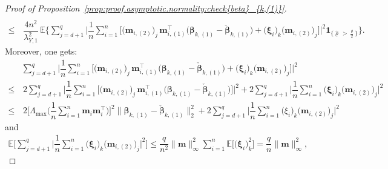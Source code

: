 \documentclass[
  12pt]{article}
\def\E{\mathbb{E}}
\def\M{\mathbf{m}}
\begin{document}
\begin{proof}[Proof of Proposition~\ref{prop:proof.asymptotic.normality:check{beta}_{k,(1)}}]
\begin{align*}
		\\
		\leq  &  \,    
		\dfrac{4 n^{2}}{\lambda_{Y,1}^{2}} \,  \E \Bigg\{  \sum_{j=d+1}^{q}  \Big| \dfrac{1}{n} \sum_{i=1}^{n} \Big[  \big( \M_{i,(2)}   \big)_{j}  \,   \M_{i,(1)}^{\top}  \big( \bm{\beta}_{k,(1)}  - \check{\bm{\beta}}_{k,(1)} \big)    +     \big( \bm{\xi}_{i}   \big)_{k}     \big( \M_{i,(2)}  \big)_{j}      \Big]   \Big|^{2}
		\mathbf{1}_{ \big\{ \widehat{ \varrho } \, > \frac{\varrho}{2} \big\} }  \Bigg\}.  
	\end{align*}
	Moreover, one gets:    
	\begin{align*}
		& \sum_{j=d+1}^{q}  \Big|  \dfrac{1}{n}  \sum_{i=1}^{n} \Big[  \big( \M_{i,(2)}   \big)_{j}  \,   \M_{i,(1)}^{\top}  \big( \bm{\beta}_{k,(1)}  - \check{\bm{\beta}}_{k,(1)} \big)    +     \big( \bm{\xi}_{i}   \big)_{k}     \big( \M_{i,(2)}  \big)_{j}      \Big]   \Big|^{2}      
		\\
		\leq  &  \,  2   \sum_{j=d+1}^{q}  \Big| \dfrac{1}{n}  \sum_{i=1}^{n} \Big[  \big( \M_{i,(2)}   \big)_{j}  \,   \M_{i,(1)}^{\top}  \big( \bm{\beta}_{k,(1)}  - \check{\bm{\beta}}_{k,(1)} \big)  \Big]   \Big|^{2}   
		+ 2   \sum_{j=d+1}^{q}  \Big| \dfrac{1}{n}  \sum_{i=1}^{n} \big( \bm{\xi}_{i}   \big)_{k}    \big( \M_{i,(2)}  \big)_{j}      \Big|^{2}   
		\\
		\leq  & \,  2 \Big[  \Lambda_{\max} \Big( \dfrac{1}{n} \sum_{i = 1}^{n}  \M_{i} \M_{i}^{\top}  \Big) \Big]^{2}  \big\|  \bm{\beta}_{k,(1)}  - \check{\bm{\beta}}_{k,(1)}  \big\|_{2}^{2}  
		+   2   \sum_{j=d+1}^{q}  \Big| \dfrac{1}{n}   \sum_{i=1}^{n} \big( \xi_{i}   \big)_{k}    \big( \M_{i,(2)}  \big)_{j}      \Big|^{2} 
	\end{align*}
	and 
	\begin{align*}
		\E \Big[ \sum_{j=d+1}^{q}  \Big| \dfrac{1}{n}   \sum_{i=1}^{n} \big( \bm{\xi}_{i}  \big)_{k}  \big( \M_{i,(2)}  \big)_{j}    \Big|^{2}  \Big]  \leq  \dfrac{q}{n^{2}} \big\| \M \big\|_{\infty}^{2}   \sum_{i=1}^{n} \E \Big[ \big( \bm{\xi}_{i}   \big)_{k}^{2} \Big] = \dfrac{q}{n} \big\| \M \big\|_{\infty}^{2}   , 

\end{align*}
\end{proof}
\end{document}
